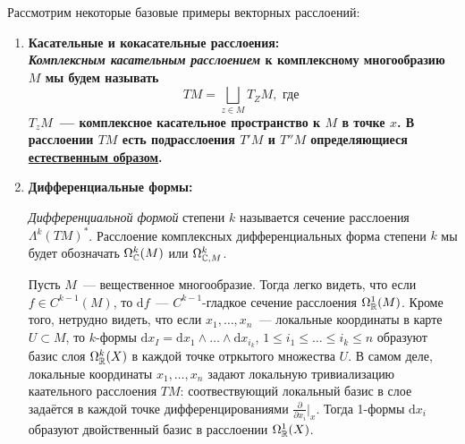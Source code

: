     \begin{example}
        Рассмотрим некоторые базовые примеры векторных расслоений: 
        \begin{enumerate}
            \item \bf{Касательные и кокасательные расслоения:}\\
            \emph{Комплексным касательным расслоением} к комплексному многообразию $M$ мы будем называть 
            \[
                TM = \bigsqcup_{z \in M}T_{Z}M, \text{ где } 
            \]
            $T_{z}M$~--- комплексное касательное пространство к $M$ в точке $x$.     
            В расслоении $TM$ есть подрасслоения $T'M$ и $T''M$ определяющиеся \hyperlink{complex_tungent_space}{естественным образом}.
            
            \item \bf{Дифференциальные формы:}
            \begin{definition} 
                \emph{Дифференциальной формой} степени $k$ называется сечение расслоения $\Lambda^k (TM)^*$. Расслоение комплексных дифференциальных форма степени $k$ мы будет обозначать $\Omega^k_{\mathbb{C}}(M)$ или $\Omega^k_{\mathbb{C}, M}$. 

                Пусть $M$~--- вещественное многообразие. Тогда легко видеть, что если $f \in C^{k - 1}(M)$, то $\mathrm{d}f$~--- $C^{k - 1}$-гладкое сечение расслоения $\Omega^1_{\mathbb{R}}(M)$. Кроме того, нетрудно видеть, что если $x_1, \ldots, x_n$~--- локальные координаты в карте $U \subset M$, то $k$-формы $\mathrm{d}x_{I} = \mathrm{d}x_1 \wedge \ldots \wedge \mathrm{d}x_{i_k}$, $1 \le i_1 \le \ldots \le i_k \le n$ образуют базис слоя $\Omega^k_{\mathbb{R}}(X)$ в каждой точке отркытого множества $U$. В самом деле, локальные координаты $x_1, \ldots, x_n$ задают локальную тривиализацию каательного расслоения $TM$: соотвествующий локальный базис в слое задаётся в каждой точке дифференцированиями $\frac{\partial}{\partial x_i}\bigg\vert_{x}$. Тогда 1-формы $\mathrm{d} x_i$ образуют двойственный базис в расслоении $\Omega^1_{\mathbb{R}}(X)$.
            \end{definition}
        \end{enumerate}
    \end{example}
